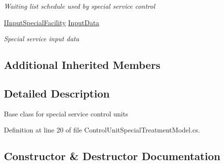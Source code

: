 \begin{DoxyCompactItemize}
\begin{DoxyCompactList}\small\item\em Waiting list schedule used by special service control \end{DoxyCompactList}\item 
\hyperlink{interface_general_health_care_elements_1_1_special_facility_1_1_i_input_special_facility}{I\+Input\+Special\+Facility} \hyperlink{class_general_health_care_elements_1_1_special_facility_1_1_control_unit_special_service_model_a97bea95bfd2ef003c88b97c71d344468}{Input\+Data}
\begin{DoxyCompactList}\small\item\em Special service input data \end{DoxyCompactList}\end{DoxyCompactItemize}
\subsection*{Additional Inherited Members}


\subsection{Detailed Description}
Base class for special service control units 



Definition at line 20 of file Control\+Unit\+Special\+Treatment\+Model.\+cs.



\subsection{Constructor \& Destructor Documentation}
